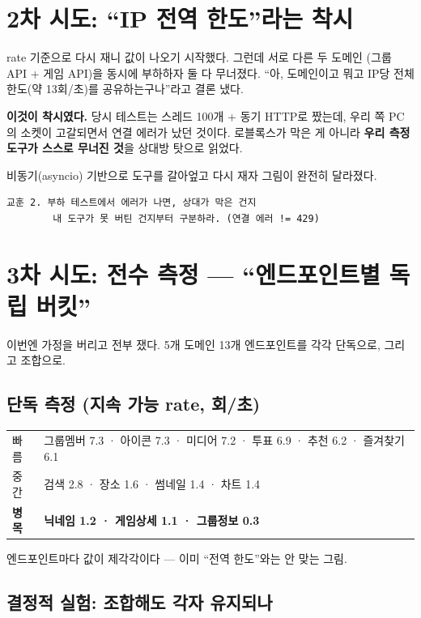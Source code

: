 \documentclass[11pt]{article}
\begin{document}
\section{2차 시도: ``IP 전역 한도''라는 착시}

rate 기준으로 다시 재니 값이 나오기 시작했다. 그런데 서로 다른 두 도메인
(그룹 API + 게임 API)을 동시에 부하하자 둘 다 무너졌다. ``아, 도메인이고 뭐고
IP당 전체 한도(약 13회/초)를 공유하는구나''라고 결론 냈다.

\textbf{이것이 착시였다.} 당시 테스트는 스레드 100개 + 동기 HTTP로 짰는데,
우리 쪽 PC의 소켓이 고갈되면서 연결 에러가 났던 것이다. 로블록스가 막은 게 아니라
\textbf{우리 측정 도구가 스스로 무너진 것}을 상대방 탓으로 읽었다.

비동기(asyncio) 기반으로 도구를 갈아엎고 다시 재자 그림이 완전히 달라졌다.

\begin{Verbatim}[frame=single, fontsize=\small]
교훈 2. 부하 테스트에서 에러가 나면, 상대가 막은 건지
        내 도구가 못 버틴 건지부터 구분하라. (연결 에러 != 429)
\end{Verbatim}

\section{3차 시도: 전수 측정 --- ``엔드포인트별 독립 버킷''}

이번엔 가정을 버리고 전부 쟀다. 5개 도메인 13개 엔드포인트를 각각 단독으로,
그리고 조합으로.

\subsection{단독 측정 (지속 가능 rate, 회/초)}
\begin{center}
\small
\begin{tabular}{llll}
\toprule
빠름 & \multicolumn{3}{l}{그룹멤버 7.3 · 아이콘 7.3 · 미디어 7.2 · 투표 6.9 · 추천 6.2 · 즐겨찾기 6.1} \\
중간 & \multicolumn{3}{l}{검색 2.8 · 장소 1.6 · 썸네일 1.4 · 차트 1.4} \\
\textbf{병목} & \multicolumn{3}{l}{\textbf{닉네임 1.2 · 게임상세 1.1 · 그룹정보 0.3}} \\
\bottomrule
\end{tabular}
\end{center}

엔드포인트마다 값이 제각각이다 --- 이미 ``전역 한도''와는 안 맞는 그림.

\subsection{결정적 실험: 조합해도 각자 유지되나}
\end{document}
